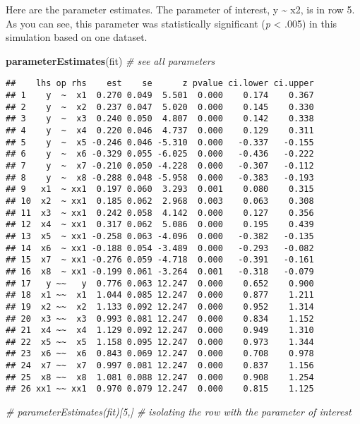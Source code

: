 \documentclass[]{article}
\newenvironment{Shaded}{\begin{snugshade}}{\end{snugshade}}
\newcommand{\KeywordTok}[1]{\textcolor[rgb]{0.13,0.29,0.53}{\textbf{#1}}}
\newcommand{\CommentTok}[1]{\textcolor[rgb]{0.56,0.35,0.01}{\textit{#1}}}
\newcommand{\NormalTok}[1]{#1}
\begin{document}
Here are the parameter estimates. The parameter of interest, y
\textasciitilde{} x2, is in row 5. As you can see, this parameter was
statistically significant (\emph{p} \textless{} .005) in this simulation
based on one dataset.

\begin{Shaded}
\begin{Highlighting}[]
\KeywordTok{parameterEstimates}\NormalTok{(fit)  }\CommentTok{# see all parameters}
\end{Highlighting}
\end{Shaded}

\begin{verbatim}
##    lhs op rhs    est    se      z pvalue ci.lower ci.upper
## 1    y  ~  x1  0.270 0.049  5.501  0.000    0.174    0.367
## 2    y  ~  x2  0.237 0.047  5.020  0.000    0.145    0.330
## 3    y  ~  x3  0.240 0.050  4.807  0.000    0.142    0.338
## 4    y  ~  x4  0.220 0.046  4.737  0.000    0.129    0.311
## 5    y  ~  x5 -0.246 0.046 -5.310  0.000   -0.337   -0.155
## 6    y  ~  x6 -0.329 0.055 -6.025  0.000   -0.436   -0.222
## 7    y  ~  x7 -0.210 0.050 -4.228  0.000   -0.307   -0.112
## 8    y  ~  x8 -0.288 0.048 -5.958  0.000   -0.383   -0.193
## 9   x1  ~ xx1  0.197 0.060  3.293  0.001    0.080    0.315
## 10  x2  ~ xx1  0.185 0.062  2.968  0.003    0.063    0.308
## 11  x3  ~ xx1  0.242 0.058  4.142  0.000    0.127    0.356
## 12  x4  ~ xx1  0.317 0.062  5.086  0.000    0.195    0.439
## 13  x5  ~ xx1 -0.258 0.063 -4.096  0.000   -0.382   -0.135
## 14  x6  ~ xx1 -0.188 0.054 -3.489  0.000   -0.293   -0.082
## 15  x7  ~ xx1 -0.276 0.059 -4.718  0.000   -0.391   -0.161
## 16  x8  ~ xx1 -0.199 0.061 -3.264  0.001   -0.318   -0.079
## 17   y ~~   y  0.776 0.063 12.247  0.000    0.652    0.900
## 18  x1 ~~  x1  1.044 0.085 12.247  0.000    0.877    1.211
## 19  x2 ~~  x2  1.133 0.092 12.247  0.000    0.952    1.314
## 20  x3 ~~  x3  0.993 0.081 12.247  0.000    0.834    1.152
## 21  x4 ~~  x4  1.129 0.092 12.247  0.000    0.949    1.310
## 22  x5 ~~  x5  1.158 0.095 12.247  0.000    0.973    1.344
## 23  x6 ~~  x6  0.843 0.069 12.247  0.000    0.708    0.978
## 24  x7 ~~  x7  0.997 0.081 12.247  0.000    0.837    1.156
## 25  x8 ~~  x8  1.081 0.088 12.247  0.000    0.908    1.254
## 26 xx1 ~~ xx1  0.970 0.079 12.247  0.000    0.815    1.125
\end{verbatim}

\begin{Shaded}
\begin{Highlighting}[]
\CommentTok{# parameterEstimates(fit)[5,]  # isolating the row with the parameter of interest}
\end{Highlighting}
\end{Shaded}
\end{document}
